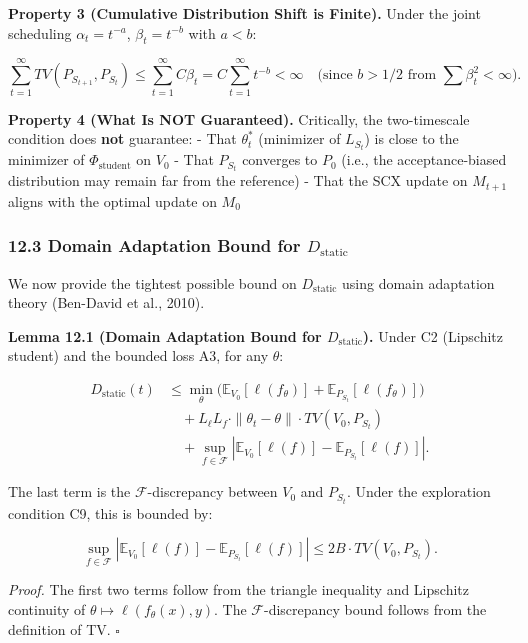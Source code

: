 \documentclass[
  12pt,
]{ctexart}
\begin{document}
\textbf{Property 3 (Cumulative Distribution Shift is Finite).} Under the
joint scheduling \(\alpha_t = t^{-a}\), \(\beta_t = t^{-b}\) with
\(a < b\):

\[\sum_{t=1}^\infty TV(P_{S_{t+1}}, P_{S_t}) \leq \sum_{t=1}^\infty C \beta_t = C \sum_{t=1}^\infty t^{-b} < \infty \quad \text{(since } b > 1/2 \text{ from } \sum \beta_t^2 < \infty\text{).}\]

\textbf{Property 4 (What Is NOT Guaranteed).} Critically, the
two-timescale condition does \textbf{not} guarantee: - That
\(\theta_t^*\) (minimizer of \(L_{S_t}\)) is close to the minimizer of
\(\Phi_{\text{student}}\) on \(V_0\) - That \(P_{S_t}\) converges to
\(P_0\) (i.e., the acceptance-biased distribution may remain far from
the reference) - That the SCX update on \(M_{t+1}\) aligns with the
optimal update on \(M_0\)

\subsubsection{\texorpdfstring{12.3 Domain Adaptation Bound for
\(D_{\text{static}}\)}{12.3 Domain Adaptation Bound for D\_\{\textbackslash text\{static\}\}}}\label{domain-adaptation-bound-for-d_textstatic}

We now provide the tightest possible bound on \(D_{\text{static}}\)
using domain adaptation theory (Ben-David et al., 2010).

\textbf{Lemma 12.1 (Domain Adaptation Bound for \(D_{\text{static}}\)).}
Under C2 (Lipschitz student) and the bounded loss A3, for any
\(\theta\):

\[\begin{aligned}
D_{\text{static}}(t) &\leq \min_{\theta} \bigl(\mathbb{E}_{V_0}[\ell(f_\theta)] + \mathbb{E}_{P_{S_t}}[\ell(f_\theta)]\bigr) \\
&\quad + L_\ell L_f \cdot \|\theta_t - \theta\| \cdot TV(V_0, P_{S_t}) \\
&\quad + \sup_{f \in \mathcal{F}} |\mathbb{E}_{V_0}[\ell(f)] - \mathbb{E}_{P_{S_t}}[\ell(f)]|.
\end{aligned}\]

The last term is the \(\mathcal{F}\)-discrepancy between \(V_0\) and
\(P_{S_t}\). Under the exploration condition C9, this is bounded by:

\[\sup_{f \in \mathcal{F}} |\mathbb{E}_{V_0}[\ell(f)] - \mathbb{E}_{P_{S_t}}[\ell(f)]| \leq 2B \cdot TV(V_0, P_{S_t}).\]

\emph{Proof.} The first two terms follow from the triangle inequality
and Lipschitz continuity of \(\theta \mapsto \ell(f_\theta(x), y)\). The
\(\mathcal{F}\)-discrepancy bound follows from the definition of TV.
\(\square\)
\end{document}
